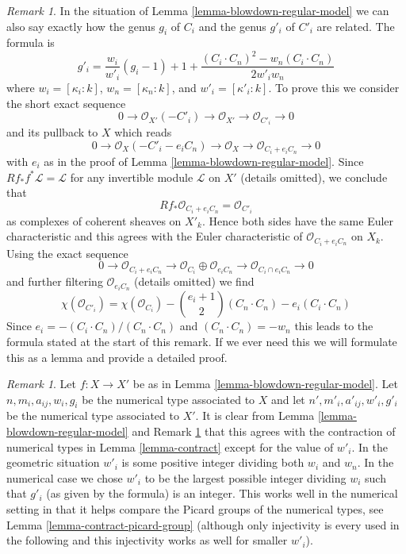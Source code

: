 \documentclass{stacks-project}
\theoremstyle{plain}
\theoremstyle{definition}
\theoremstyle{remark}
\newtheorem{remark}[subsection]{Remark}
\numberwithin{equation}{subsection}
\begin{document}
\begin{remark}
\label{remark-genus-change}
In the situation of Lemma \ref{lemma-blowdown-regular-model}
we can also say exactly how the genus $g_i$ of $C_i$ and the genus
$g'_i$ of $C'_i$ are related. The formula is
$$
g'_i = \frac{w_i}{w'_i}(g_i - 1) + 1 +
\frac{(C_i \cdot C_n)^2 - w_n(C_i \cdot C_n)}{2w'_iw_n}
$$
where $w_i = [\kappa_i : k]$, $w_n = [\kappa_n : k]$, and
$w'_i = [\kappa'_i : k]$.
To prove this we consider the short exact sequence
$$
0 \to \mathcal{O}_{X'}(-C'_i) \to \mathcal{O}_{X'} \to
\mathcal{O}_{C'_i} \to 0
$$
and its pullback to $X$ which reads
$$
0 \to \mathcal{O}_X(-C'_i - e_iC_n) \to \mathcal{O}_X \to
\mathcal{O}_{C_i + e_i C_n} \to 0
$$
with $e_i$ as in the proof of Lemma \ref{lemma-blowdown-regular-model}.
Since $Rf_*f^*\mathcal{L} = \mathcal{L}$ for any invertible module
$\mathcal{L}$ on $X'$ (details omitted), we conclude that
$$
Rf_*\mathcal{O}_{C_i + e_i C_n} = \mathcal{O}_{C'_i}
$$
as complexes of coherent sheaves on $X'_k$.
Hence both sides have the same Euler characteristic and this
agrees with the Euler characteristic of $\mathcal{O}_{C_i + e_i C_n}$
on $X_k$. Using the exact sequence
$$
0 \to \mathcal{O}_{C_i + e_i C_n} \to
\mathcal{O}_{C_i} \oplus \mathcal{O}_{e_iC_n} \to
\mathcal{O}_{C_i \cap e_iC_n} \to 0
$$
and further filtering $\mathcal{O}_{e_iC_n}$ (details omitted) we find
$$
\chi(\mathcal{O}_{C'_i}) =
\chi(\mathcal{O}_{C_i}) - {e_i + 1 \choose 2}(C_n \cdot C_n)
- e_i(C_i \cdot C_n)
$$
Since $e_i = -(C_i \cdot C_n)/(C_n \cdot C_n)$ and
$(C_n \cdot C_n) = -w_n$ this leads to the formula
stated at the start of this remark. If we ever need
this we will formulate this as a lemma and
provide a detailed proof.
\end{remark}

\begin{remark}
\label{remark-compare-contractions}
Let $f : X \to X'$ be as in Lemma \ref{lemma-blowdown-regular-model}.
Let $n, m_i, a_{ij}, w_i, g_i$ be the numerical type associated to $X$ and
let $n', m'_i, a'_{ij}, w'_i, g'_i$ be the numerical type associated to $X'$.
It is clear from Lemma \ref{lemma-blowdown-regular-model} and
Remark \ref{remark-genus-change}
that this agrees with the contraction of numerical types in
Lemma \ref{lemma-contract}
except for the value of $w'_i$.
In the geometric situation $w'_i$ is some positive integer
dividing both $w_i$ and $w_n$. In the numerical case
we chose $w'_i$ to be the largest possible integer dividing
$w_i$ such that $g'_i$ (as given by the formula) is an integer.
This works well in the numerical setting
in that it helps compare the Picard groups
of the numerical types, see Lemma \ref{lemma-contract-picard-group}
(although only injectivity is every used in the following and this
injectivity works as well for smaller $w'_i$).
\end{remark}
\end{document}
